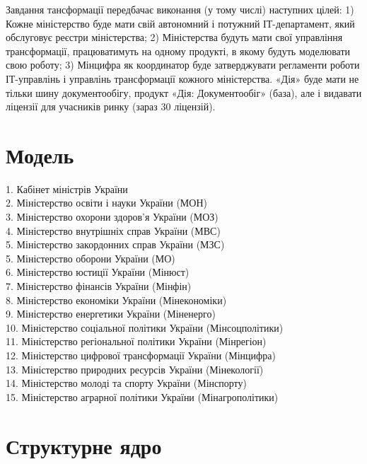 Завдання тансформації передбачає виконання (у тому числі) наступних цілей:
1) Кожне міністерство буде мати свій автономний і потужний ІТ-департамент,
який обслуговує реєстри міністерства; 2) Міністерства будуть мати свої
управління трансформації, працюватимуть на одному продукті, в якому
будуть моделювати свою роботу; 3) Мінцифра як координатор буде затверджувати
регламенти роботи ІТ-управлінь і управлінь трансформації кожного міністерства.
«Дія» буде мати не тільки шину документообігу, продукт «Дія: Документообіг»
(база), але і видавати ліцензії для учасників ринку (зараз 30 ліцензій).

\section{Модель}

1. Кабінет міністрів України \\
2. Міністерство освіти і науки України (МОН) \\
3. Міністерство охорони здоров'я України (МОЗ) \\
4. Міністерство внутрішніх справ України (МВС) \\
5. Міністерство закордонних справ України (МЗС) \\
5. Міністерство оборони України (МО) \\
6. Міністерство юстиції України (Мінюст) \\
7. Міністерство фінансів України (Мінфін) \\
8. Міністерство економіки України (Мінекономіки) \\
9. Міністерство енергетики України (Міненерго) \\
10. Міністерство соціальної політики України (Мінсоцполітики) \\
11. Міністерство регіональної політики України (Мінрегіон) \\
12. Міністерство цифрової трансформації України (Мінцифра) \\
13. Міністерство природних ресурсів України (Мінекології) \\
14. Міністерство молоді та спорту України (Мінспорту) \\
15. Міністерство аграрної політики України (Мінагрополітики) \\

\newpage
\section{Структурне ядро}

